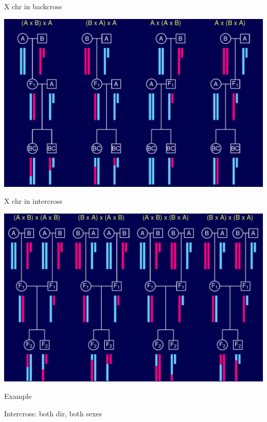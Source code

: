 \documentclass[12pt]{article}
\newcommand{\headsize}{\fontsize{35}{35} \selectfont}
\newcommand{\textsize}{\fontsize{30}{35} \selectfont}
\begin{document}
\newpage

\headsize \color{myyellow}
\hfill X chr in backcross

\vfill

\centerline{\includegraphics[]{Figs/xchr_bc.pdf}}


\newpage

\headsize \color{myyellow}
\hfill X chr in intercross

\vfill

\centerline{\includegraphics[]{Figs/xchr_f2.pdf}}




\newpage

\headsize \color{myyellow}
\hfill Example

\vspace{3cm}

\color{mywhite} \textsize

Intercross: both dir, both sexes
\end{document}
